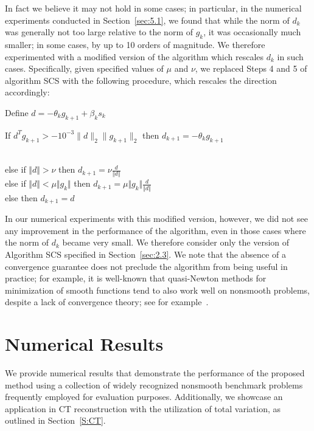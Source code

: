\documentclass[]{interact}
\theoremstyle{plain}%
\theoremstyle{definition}
\theoremstyle{remark}
\begin{document}
In fact we believe it may not hold in some cases; in particular, in the numerical experiments conducted in Section~\ref{sec:5.1}, we found that while the norm of $d_k$ was generally not too large relative to the norm of $g_k$, it was occasionally much smaller; in some cases, by up to 10 orders of magnitude. We therefore experimented with a modified version of the algorithm which rescales $d_k$ in such cases. Specifically, given specified values of $\mu$ and $\nu$, we replaced Steps 4 and 5 of algorithm SCS with the following procedure, which rescales the direction accordingly:
\begin{enumerate}
\setcounter{enumi}{3}
\item Define $d = -\theta_kg_{k+1} +\beta_ks_k$
{\item If $d^Tg_{k+1} > -10^{-3}\parallel d \parallel_2 \parallel g_{k+1}\parallel_2$
\subitem then $d_{k+1}=-\theta_kg_{k+1}$}\\
{else if $\Vert d \Vert > \nu$
\subitem then $d_{k+1} = \nu \frac{d}{\Vert d \Vert}$}\\
{else if $\Vert d \Vert < \mu \Vert g_k \Vert$
\subitem then $d_{k+1} = \mu \Vert g_k \Vert \frac{d}{\Vert d \Vert}$} \\
{else
\subitem then $d_{k+1} = d$}
\end{enumerate}
In our numerical experiments with this modified version, however, we did not see any improvement in the performance of the algorithm, even in those cases where the norm of $d_k$ became very small. We therefore consider only the version of Algorithm SCS specified in Section~\ref{sec:2.3}. We note that the absence of a convergence guarantee does not preclude the algorithm from being useful in practice; for example, it is well-known that quasi-Newton methods for minimization of smooth functions tend to also work well on nonsmooth problems, despite a lack of convergence theory; see for example~\cite{LO13}.


\section{Numerical Results}
\label{S:experiments}

{We provide numerical results that demonstrate the performance of the proposed method using a collection of widely recognized nonsmooth benchmark problems frequently employed for evaluation purposes. Additionally, we showcase an application in CT reconstruction with the utilization of total variation, as outlined in Section~\ref{S:CT}}.
\end{document}
